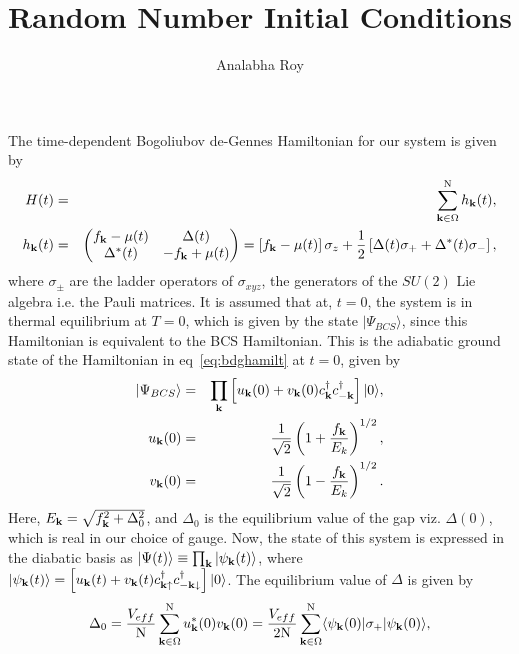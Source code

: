 \documentclass[a4paper,10pt]{article}
\title{Random Number Initial Conditions}
\author{Analabha Roy}
\begin{document}
\maketitle
 The time-dependent Bogoliubov de-Gennes Hamiltonian for our system is given by
\begin{eqnarray}
\label{eq:bdghamilt}
H(t) &=& \sum^{\mathrm N}_{{\bf k}\in\Omega} h_{\bf k}(t), \nonumber \\
h_{\bf k}(t) &=& \begin{pmatrix}
f_{\bf k}-\mu(t) & \Delta(t)\\
\Delta^{\ast}(t) & -f_{\bf k}+\mu(t)
\end{pmatrix}=\left[f_{\bf k}-\mu(t)\right]\sigma_z +\frac{1}{2}\left[ \Delta(t) \sigma_+ + \Delta^\ast(t)\sigma_-\right],
\end{eqnarray}
where $\sigma_\pm$ are the ladder operators of $\sigma_{xyz}$, the generators of the $SU(2)$ Lie algebra i.e. the Pauli matrices. It is assumed that at, $t=0$, the system is in thermal equilibrium at $T=0$, which is given by the state $|\Psi_{BCS}\rangle$, since this Hamiltonian is equivalent to the BCS Hamiltonian. This is the adiabatic ground state of the Hamiltonian in eq~\ref{eq:bdghamilt} at $t=0$, given by
\begin{eqnarray}
\label{eq:bcs:state}
|\Psi_{BCS}\rangle &=& \prod_{\bf k} \left[ u_{\bf k}(0) + v_{\bf k}(0) c^\dagger_{\bf k}c^\dagger_{-\bf k}\right] |0\rangle, \nonumber \\
u_{\bf k}(0)&=&\frac{1}{\sqrt{2}}\left(1+\frac{f_{\bf k}}{E_k}\right)^{1/2}, \nonumber \\
v_{\bf k}(0)&=&\frac{1}{\sqrt{2}}\left(1-\frac{f_{\bf k}}{E_k}\right)^{1/2}.
\end{eqnarray}
Here, $E_{\bf k} = \sqrt{f^2_{\bf k}+\Delta ^2_0}$, and $\Delta_0$ is the equilibrium value of the gap viz. $\Delta(0)$, which is real in our choice of gauge. Now, the state of this system is expressed in the diabatic basis as $|\Psi(t)\rangle\equiv \prod_{\bf k}|\psi_{\bf k}(t)\rangle$, where $|\psi_{\bf k}(t)\rangle = \left[u_{\bf k}(t)+v_{\bf k}(t)c^\dagger_{{\bf k}\uparrow}c^\dagger_{-{\bf k}\downarrow}\right]|0\rangle$. The equilibrium value of $\Delta$ is given by
\begin{equation}
\label{eq:gapformula}
\Delta_0 = \frac{V_{eff}}{\mathrm N}\sum^{\mathrm N}_{{\bf k}\in\Omega} u^{\ast}_{\bf k}(0) v_{\bf k}(0) = \frac{V_{eff}}{2\mathrm{N}}\sum^{\mathrm N}_{{\bf k}\in\Omega}\langle\psi_{\bf k}(0)|\sigma_+|\psi_{\bf k}(0)\rangle,
\end{equation}
\end{document}
